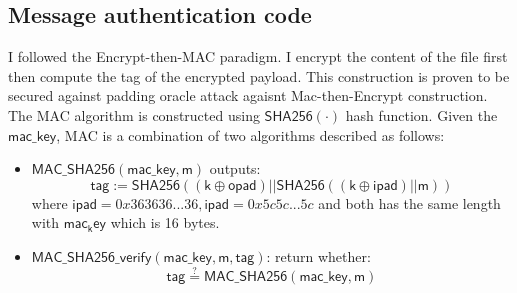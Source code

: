 \documentclass[a4paper,10pt]{article}
\begin{document}
\subsection{Message authentication code} %
\label{sub:message-authentication}
I followed the Encrypt-then-MAC paradigm. I encrypt the content of the file first then compute the tag of the encrypted payload. This construction is proven to be secured against padding oracle attack agaisnt Mac-then-Encrypt construction. 
The MAC algorithm is constructed using $\mathsf{SHA256(\cdot)}$ hash function. Given the $\mathsf{mac\_key}$, MAC is a combination of two algorithms described as follows:
\begin{itemize}
  \item $\mathsf{MAC\_SHA256(mac\_key, m)}$ outputs:
    $$\mathsf{tag}:= \mathsf{SHA256((k\oplus opad)||SHA256((k\oplus ipad)||m))}$$
  where $\mathsf{ipad} = 0x363636...36, \mathsf{ipad} = 0x5c5c...5c$ and both has the same length with $\mathsf{mac_key}$ which is 16 bytes.
  \item $\mathsf{MAC\_SHA256\_verify(mac\_key, m, tag)}$: return whether:
  $$\mathsf{tag} \stackrel{?}= \mathsf{MAC\_SHA256(mac\_key, m)}$$
\end{itemize}
\end{document}
